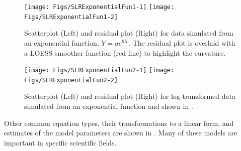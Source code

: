 \documentclass[10pt,openany]{book}\usepackage[]{graphicx}\usepackage[]{color}
\newenvironment{knitrout}{}{} %
\begin{document}
\begin{knitrout}
\color{fgcolor}\begin{figure}[h]

{\centering \texttt{[image: Figs/SLRExponentialFun1-1]} 
\texttt{[image: Figs/SLRExponentialFun1-2]} 

}

\caption[Scatterplot (Left) and residual plot (Right) for data simulated from an exponential function, ]{Scatterplot (Left) and residual plot (Right) for data simulated from an exponential function, $Y=ae^{bX}$.  The residual plot is overlaid with a LOESS smoother function (red line) to highlight the curvature.}\label{fig:SLRExponentialFun1}
\end{figure}


\end{knitrout}

\begin{knitrout}
\color{fgcolor}\begin{figure}[h]

{\centering \texttt{[image: Figs/SLRExponentialFun2-1]} 
\texttt{[image: Figs/SLRExponentialFun2-2]} 

}

\caption[log-transformed exponential function.]{Scatterplot (Left) and residual plot (Right) for log-transformed data simulated from an exponential function and shown in .}\label{fig:SLRExponentialFun2}
\end{figure}


\end{knitrout}

Other common equation types, their transformations to a linear form, and estimates of the model parameters are shown in .  Many of these models are important in specific scientific fields.
\end{document}
